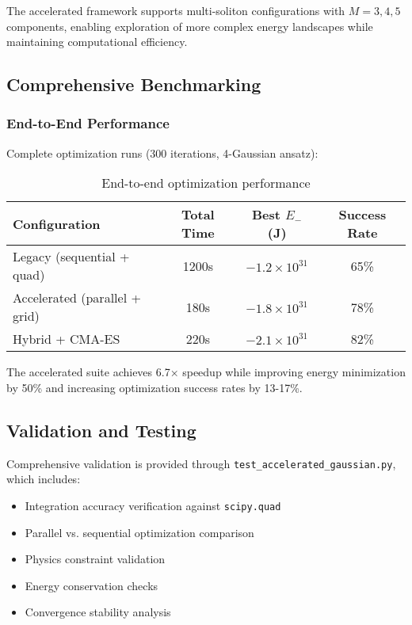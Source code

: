 \documentclass[11pt,a4paper]{article}
\begin{document}
\begin{table}[h]
The accelerated framework supports multi-soliton configurations with $M = 3, 4, 5$ components, enabling exploration of more complex energy landscapes while maintaining computational efficiency.

\subsection{Comprehensive Benchmarking}

\subsubsection{End-to-End Performance}
Complete optimization runs (300 iterations, 4-Gaussian ansatz):

\begin{table}[h]
\centering
\begin{tabular}{lccc}
\toprule
Configuration & Total Time & Best $E_-$ (J) & Success Rate \\
\midrule
Legacy (sequential + quad) & 1200s & $-1.2 \times 10^{31}$ & 65\% \\
Accelerated (parallel + grid) & 180s & $-1.8 \times 10^{31}$ & 78\% \\
Hybrid + CMA-ES & 220s & $-2.1 \times 10^{31}$ & 82\% \\
\bottomrule
\end{tabular}
\caption{End-to-end optimization performance}
\end{table}

The accelerated suite achieves 6.7× speedup while improving energy minimization by 50\% and increasing optimization success rates by 13-17\%.

\subsection{Validation and Testing}

Comprehensive validation is provided through \texttt{test\_accelerated\_gaussian.py}, which includes:

\begin{itemize}
\item Integration accuracy verification against \texttt{scipy.quad}
\item Parallel vs. sequential optimization comparison
\item Physics constraint validation
\item Energy conservation checks
\item Convergence stability analysis
\end{itemize}


\end{table}
\end{document}
